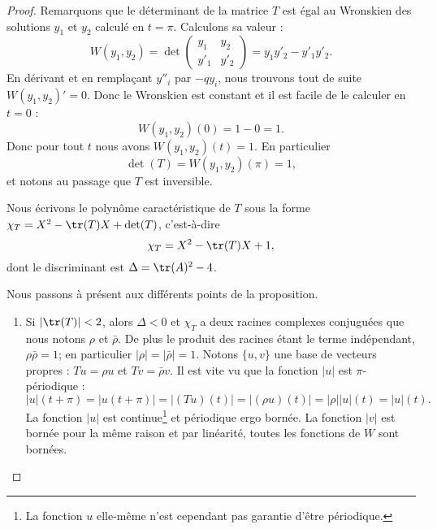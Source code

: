 \begin{proof}
    Remarquons que le déterminant de la matrice \( T\) est égal au Wronskien des solutions \( y_1\) et \( y_2\) calculé en \( t=\pi\). Calculons sa valeur :
    \begin{equation}
        W(y_1,y_2)=\det\begin{pmatrix}
            y_1    &   y_2    \\
            y'_1    &   y'_2
        \end{pmatrix}=y_1y'_2-y'_1y'_2.
    \end{equation}
    En dérivant et en remplaçant \( y''_i\) par \( -qy_i\), nous trouvons tout de suite \( W(y_1,y_2)'=0\). Donc le Wronskien est constant et il est facile de le calculer en \( t=0\) :
    \begin{equation}
        W(y_1,y_2)(0)=1-0=1.
    \end{equation}
    Donc pour tout \( t\) nous avons \( W(y_1,y_2)(t)=1\). En particulier
    \begin{equation}
        \det(T)=W(y_1,y_2)(\pi)=1,
    \end{equation}
    et notons au passage que \( T\) est inversible.

    Nous écrivons le polynôme caractéristique de \( T\) sous la forme \( \chi_T=X^2-\tr(T)X+\det(T)\), c'est-à-dire
    \begin{equation}
        \chi_T=X^2-\tr(T)X+1,
    \end{equation}
    dont le discriminant est \( \Delta=\tr(A)^2-4\).

    Nous passons à présent aux différents points de la proposition.
    \begin{enumerate}
        \item
            Si \( | \tr(T) |<2\), alors \( \Delta<0\) et \( \chi_T\) a deux racines complexes conjuguées que nous notons \( \rho\) et \( \bar\rho\). De plus le produit des racines étant le terme indépendant, \( \rho\bar\rho=1\); en particulier \( | \rho |=| \bar \rho |=1\). Notons \( \{ u,v \}\) une base de vecteurs propres : \( Tu=\rho u\) et \( Tv=\bar \rho v\). Il est vite vu que la fonction \( | u |\) est \( \pi\)-périodique :
            \begin{equation}
                | u |(t+\pi)=| u(t+\pi) |=| (Tu)(t) |=| (\rho u)(t) |=| \rho | | u |(t)=| u |(t).
            \end{equation}
            La fonction \( | u |\) est continue\footnote{La fonction \( u\) elle-même n'est cependant pas garantie d'être périodique.} et périodique ergo bornée. La fonction \( | v |\) est bornée pour la même raison et par linéarité, toutes les fonctions de \( W\) sont bornées.


\end{enumerate}
\end{proof}
